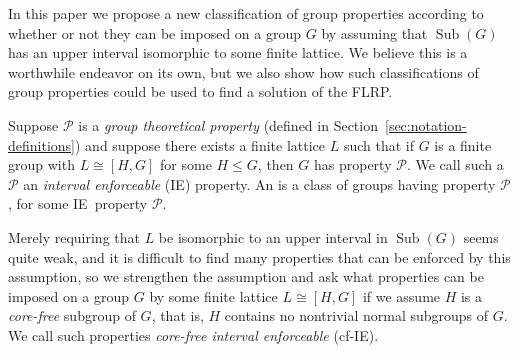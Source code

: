 \documentclass[11pt]{amsart}
\theoremstyle{plain}
\theoremstyle{definition}
\theoremstyle{remark}
\numberwithin{theorem}{section}
\numberwithin{claim}{section}
\numberwithin{equation}{section}
\numberwithin{conjecture}{section}
\newcommand{\<}{\ensuremath{\langle}}
\renewcommand{\>}{\ensuremath{\rangle}}
\renewcommand{\leq}{\ensuremath{\leqslant}}
\newcommand{\Sub}{\ensuremath{\operatorname{Sub}}}
\newcommand{\FLRP}{{\small FLRP}}
\newcommand{\0}{\ensuremath{\mathbf{0}}}
\newcommand{\1}{\ensuremath{\mathbf{1}}}
\newcommand{\2}{\ensuremath{\mathbf{2}}}
\newcommand{\3}{\ensuremath{\mathbf{3}}}
\newcommand{\4}{\ensuremath{\mathbf{4}}}
\newcommand{\5}{\ensuremath{\mathbf{5}}}
\newcommand{\cP}{\ensuremath{\mathcal{P}}}
\newcommand{\IE}{{\small IE}}
\begin{document}
In this paper we propose a new classification of group properties according to whether
or not they can be imposed on a group $G$ by assuming that $\Sub(G)$ has an
upper interval isomorphic to some  finite
lattice.  We believe this is a worthwhile endeavor on its own, but 
we also show how such classifications of group properties could be used to find a
solution of the \FLRP.

Suppose $\cP$ is a \emph{group theoretical property} 
(defined in Section~\ref{sec:notation-definitions}) 
and suppose there exists a finite lattice $L$ such that if $G$ is a finite group
with $L \cong [H,G]$ for some $H\leq G$, then $G$ has property $\cP$.  We call
such a  $\cP$ an \emph{interval enforceable} (\IE) property.  
An  is a class of groups having
property $\cP$, for some \IE\ property $\cP$. 

Merely requiring that $L$ be isomorphic to an upper interval in $\Sub(G)$ seems quite
weak, and it is difficult to find many properties that can be enforced by this
assumption,
so we strengthen the assumption and ask what properties can be imposed on a
group $G$ by some finite lattice $L\cong[H,G]$ if we assume $H$ is a \emph{core-free}
subgroup of $G$, that is, $H$ contains no nontrivial normal subgroups of $G$.  
We call such properties \emph{core-free interval enforceable} (cf-\IE).  
\end{document}
